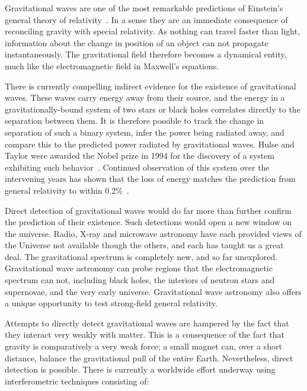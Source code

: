 Gravitational waves are one of the most remarkable predictions of
Einstein's general theory of relativity~\cite{Einstein:1916}.  In a
sense they are an immediate consequence of reconciling gravity with
special relativity.  As nothing can travel faster than light,
information about the change in position of an object can not
propagate instantaneously.  The gravitational field therefore becomes
a dynamical entity, much like the electromagnetic field in Maxwell's
equations.

There is currently compelling indirect evidence for the existence of
gravitational waves.  These waves carry energy away from their source,
and the energy in a gravitationally-bound system of two stars or black
holes correlates directly to the separation between them.  It is
therefore possible to track the change in separation of such a binary
system, infer the power being radiated away, and compare this to the
predicted power radiated by gravitational waves.  Hulse and Taylor
were awarded the Nobel prize in 1994 for the discovery of a system
exhibiting such behavior~\cite{Hulse:1994, Taylor:1994}. Continued
observation of this system over the intervening years has shown that
the loss of energy matches the prediction from general relativity to
within 0.2\%~\cite{Weisberg:2004hi}.


Direct detection of gravitational waves would do far more than further
confirm the prediction of their existence.  Such detections would open
a new window on the universe.  Radio, X-ray and microwave astronomy
have each provided views of the Universe not available though the
others, and each has taught us a great deal.  The gravitational
spectrum is completely new, and so far unexplored.  Gravitational wave
astronomy can probe regions that the electromagnetic spectrum can not,
including black holes, the interiors of neutron stars and supernovae,
and the very early universe.  Gravitational wave astronomy also offers
a unique opportunity to test strong-field general relativity.

Attempts to directly detect gravitational waves are hampered by the
fact that they interact very weakly with matter.  This is a
consequence of the fact that gravity is comparatively a very weak
force; a small magnet can, over a short distance, balance the
gravitational pull of the entire Earth.  Nevertheless, direct
detection is possible.  There is currently a worldwide effort underway
using interferometric techniques consisting of:

